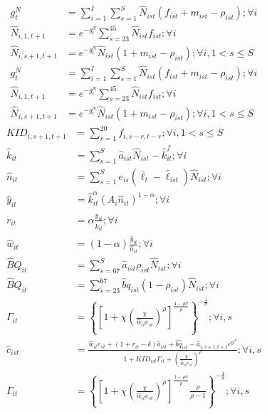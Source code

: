 \documentclass[letterpaper,12pt]{article}
\theoremstyle{definition}
\numberwithin{equation}{section}
\begin{document}
\begin{spacing}{1.5}
	\begin{align}
		g^N_t & = \sum_{i=1}^I \sum_{s=1}^S \hat N_{ist} (f_{ist}+m_{ist}-\rho_{ist}) ; \forall i \label{eq_4gNdef}\\
		\hat N_{i,1,t+1} & = e^{-g^N_t}\sum_{s=23}^{45} \hat N_{ist} f_{ist} ; \forall i\\
		\hat N_{i,s+1,t+1} & = e^{-g^N_t}\hat N_{ist} (1+m_{ist}-\rho_{ist}); \forall i, 1<s\le S \label{eq_4pop2} \\
		g^N_t & = \sum_{i=1}^I \sum_{s=1}^S \hat N_{ist} (f_{ist}+m_{ist}-\rho_{ist}) ; \forall i\\
		\hat N_{i,1,t+1} & = e^{-g^N_t}\sum_{s=23}^{45} \hat N_{ist} f_{ist} ; \forall i\\
		\hat N_{i,s+1,t+1} & = e^{-g^N_t}\hat N_{ist} (1+m_{ist}-\rho_{ist}); \forall i, 1<s\le S 
	\end{align}
	\begin{align}
		KID_{i,s+1,t+1} & = \sum_{r=1}^{20} f_{i,s-r,t-r}; \forall i, 1<s\le S  \\
		\hat k_{it} & = \sum_{s=1}^S \hat a_{ist} \hat N_{ist} - \hat k_{it}^f; \forall i \\
		\hat n_{it} & = \sum_{s=1}^S e_{is} (\bar \ell_t - \hat \ell_{ist}) \hat N_{ist}; \forall i \\
		\hat y_{it} & = \hat k_{it}^\alpha \left( A_{i} \hat n_{it} \right)^{1-\alpha} ; \forall i \\
		r_{it} & = \alpha \frac{\hat y_{it}}{\hat k_{it}}; \forall i \\
		\hat w_{it} & = (1-\alpha) \frac{\hat y_{it}}{\hat n_{it}}; \forall i \\
		\hat BQ_{it} & = \sum_{s=67}^S \hat a_{ist} \rho_{ist} \hat N_{ist} ; \forall i \\
		\hat BQ_{it} & = \sum_{s=23}^{67} \hat bq_{ist} (1-\rho_{ist}) \hat N_{ist}	; \forall i \\
		\Gamma_{it} & = \left\{ \left[1 + \chi \left(\frac{\chi}{\hat w_{it} e_{st}}\right)^\rho\right]^{\tfrac{1-\rho \sigma}{\rho}} \right\}^{-\tfrac{1}{\sigma}}; \forall i,s \\
    	\hat c_{ist} & = \frac{\hat w_{it} e_{st} + (1+r_{it}-\delta)\hat a_{ist} + \hat{bq}_{ist} - \hat a_{i,s+1,t+1} e^{g^A}} {1 + KID_{ist}\Gamma_{it} + \left(\tfrac{\chi}{\hat w_{it}e_{st}}\right)^\rho}; \forall i,s \\
		\Gamma_{it} & = \left\{ \left[1 + \chi \left(\frac{\chi}{\hat w_{it} e_{st}}\right)^\rho\right]^{\tfrac{1-\rho \sigma}{\rho}} \frac{\rho}{\rho-1} \right\}^{-\tfrac{1}{\sigma}}; \forall i,s \\

\end{align}
\end{spacing}
\end{document}

